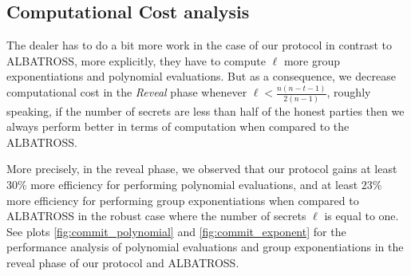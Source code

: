 \subsection{Computational Cost analysis}
The dealer has to do a bit more work in the case of our protocol in contrast to ALBATROSS, more explicitly, 
they have to compute $\ell$ more group exponentiations and polynomial evaluations. But as a consequence, 
we decrease computational cost in the \textit{Reveal} phase whenever $\ell < \frac{n(n-t-1)}{2(n-1)}$, roughly 
speaking, if the number of secrets are less than half of the honest parties then we always perform better in 
terms of computation when compared to the ALBATROSS.\par

More precisely, in the reveal phase, we observed that our protocol gains at least $30\%$ more
efficiency for performing polynomial evaluations, and at least $23\%$ more efficiency for 
performing group exponentiations when compared to ALBATROSS in the robust case where the number of 
secrets $\ell$ is equal to one. See plots \ref{fig:commit_polynomial} 
and \ref{fig:commit_exponent} for the performance analysis of polynomial evaluations and group exponentiations
in the reveal phase of our protocol and ALBATROSS.





